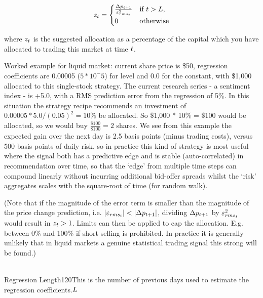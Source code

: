 \documentclass{article}%
\begin{document}
\vspace{1mm}
\begin{equation}
    z_t = 
    \begin{cases}
    \frac{\Delta p_{t+1}}{\varepsilon^{{2}}_{rms_{t}}} & \text{if } t > L,\\
    0                                        & \text{otherwise}
    \end{cases}
\end{equation}



\vspace{1mm}
\justify where $z_t$ is the suggested allocation as a percentage of the capital which you have allocated to trading this market at time $t$.

\justify Worked example for liquid market:  current share price is \$50, regression coefficients are 0.00005 ($5 * 10^-5$) for level and 0.0 for the constant, with \$1,000 allocated to this single-stock strategy.  The current research series - a sentiment index - is +5.0, with a RMS prediction error from the regression of 5\%. In this situation the strategy recipe recommends an investment of $0.00005 * 5.0 / (0.05)^2 = 10\%$ be allocated. So \$1,000 * 10\% = \$100 would be allocated, so we would buy $\frac{\$100}{\$100} = 2$ shares.
We see from this example the expected gain over the next day is 2.5 basis points (minus trading costs), versus 500 basis points of daily risk, so in practice this kind of strategy is most useful where the signal both has a predictive edge and is stable (auto-correlated) in recommendation over time, so that the `edge' from multiple time steps can compound linearly without incurring additional bid-offer spreads whilst the `risk' aggregates scales with the square-root of time (for random walk).


\vspace{1mm}
\justify (Note that if the magnitude of the error term is smaller than the magnitude of the price change prediction, i.e. $|\varepsilon_{rms_{t}}| < |\Delta p_{t+1}|$, dividing $\Delta p_{t+1}$ by $\varepsilon^{{2}}_{rms_{t}}$ would result in $z_t>1$. Limits can then be applied to cap the allocation. E.g. between 0\% and 100\% if short selling is prohibited. In practice it is generally unlikely that in liquid markets a genuine statistical trading signal this strong will be found.)

\\
\vspace{1mm}
\fixedruleparameters
{Regression Length}{120}{This is the number of previous days used to estimate the regression coefficients.}{$L$}%
\stoptable 
\end{document}
